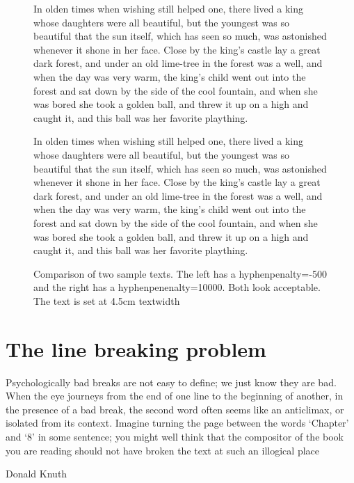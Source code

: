 {{\begin{figure*}[htb]
\fussy
{} 
\begin{minipage}[t]{4.5cm}
\mbox{}
\trypar{}
In olden times when wishing
still helped one, there lived a
king whose daughters were all
beautiful, but the youngest was so
beautiful that the sun itself,
which has seen so much, was
astonished whenever it shone in
her face. Close by the king's
castle lay a great dark forest,
and under an old lime-tree in the
forest was a well, and when
the day was very warm, the
king's child went out into the 
forest and sat down by the side
of the cool fountain, and when she was bored she
took a golden ball, and threw it up on a high and caught it, and this
ball was her favorite plaything. \par
\end{minipage}
\hspace{2cm}
\begin{minipage}[t]{4.5cm}
\mbox{}
\trypar{}
In olden times when wishing
still helped one, there lived a
king whose daughters were all
beautiful, but the youngest was so
beautiful that the sun itself,
which has seen so much, was
astonished whenever it shone in
her face. Close by the king's
castle lay a great dark forest,
and under an old lime-tree in the
forest was a well, and when
the day was very warm, the
king's child went out into the 
forest and sat down by the side
of the cool fountain, and when she was bored she
took a golden ball, and threw it up on a high and caught it, and this
ball was her favorite plaything. \par
\end{minipage}
\caption{Comparison of two sample texts. The left has a hyphenpenalty=-500 and the right has a hyphenpenenalty=10000. Both look acceptable. The text is set at 4.5cm textwidth}
\end{figure*}




\chapter{The line breaking problem}

\epigraph{Psychologically bad breaks are not easy to define; we just know they are bad. When
the eye journeys from the end of one line to the beginning of another, in the presence
of a bad break, the second word often seems like an anticlimax, or isolated from
its context. Imagine turning the page between the words ‘Chapter’ and ‘8’ in some
sentence; you might well think that the compositor of the book you are reading should
not have broken the text at such an illogical place}{Donald Knuth}

}}

